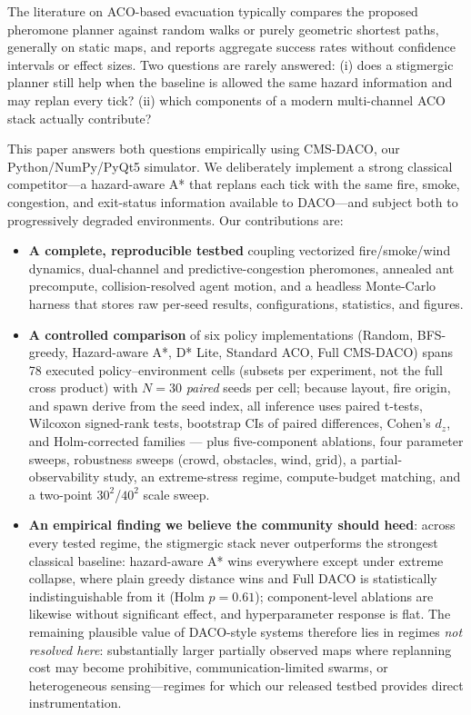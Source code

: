 ﻿\documentclass[conference]{IEEEtran}
\begin{document}
The literature on ACO-based evacuation typically compares the proposed pheromone planner against random walks or purely geometric shortest paths, generally on static maps, and reports aggregate success rates without confidence intervals or effect sizes. Two questions are rarely answered: (i) does a stigmergic planner still help when the baseline is allowed the same hazard information and may replan every tick? (ii) which components of a modern multi-channel ACO stack actually contribute?

This paper answers both questions empirically using CMS-DACO, our Python/NumPy/PyQt5 simulator. We deliberately implement a strong classical competitor---a hazard-aware A* that replans each tick with the same fire, smoke, congestion, and exit-status information available to DACO---and subject both to progressively degraded environments. Our contributions are:

\begin{itemize}
\item \textbf{A complete, reproducible testbed} coupling vectorized fire/smoke/wind dynamics, dual-channel and predictive-congestion pheromones, annealed ant precompute, collision-resolved agent motion, and a headless Monte-Carlo harness that stores raw per-seed results, configurations, statistics, and figures.
\item \textbf{A controlled comparison} of six policy implementations (Random, BFS-greedy, Hazard-aware A*, D* Lite, Standard ACO, Full CMS-DACO) spans 78 executed policy--environment cells (subsets per experiment, not the full cross product) with $N{=}30$ \emph{paired} seeds per cell; because layout, fire origin, and spawn derive from the seed index, all inference uses paired t-tests, Wilcoxon signed-rank tests, bootstrap CIs of paired differences, Cohen's $d_z$, and Holm-corrected families --- plus five-component ablations, four parameter sweeps, robustness sweeps (crowd, obstacles, wind, grid), a partial-observability study, an extreme-stress regime, compute-budget matching, and a two-point $30^2$/$40^2$ scale sweep.
\item \textbf{An empirical finding we believe the community should heed}: across every tested regime, the stigmergic stack never outperforms the strongest classical baseline: hazard-aware A* wins everywhere except under extreme collapse, where plain greedy distance wins and Full DACO is statistically indistinguishable from it (Holm $p{=}0.61$); component-level ablations are likewise without significant effect, and hyperparameter response is flat. The remaining plausible value of DACO-style systems therefore lies in regimes \emph{not resolved here}: substantially larger partially observed maps where replanning cost may become prohibitive, communication-limited swarms, or heterogeneous sensing---regimes for which our released testbed provides direct instrumentation.
\end{itemize}
\end{document}

